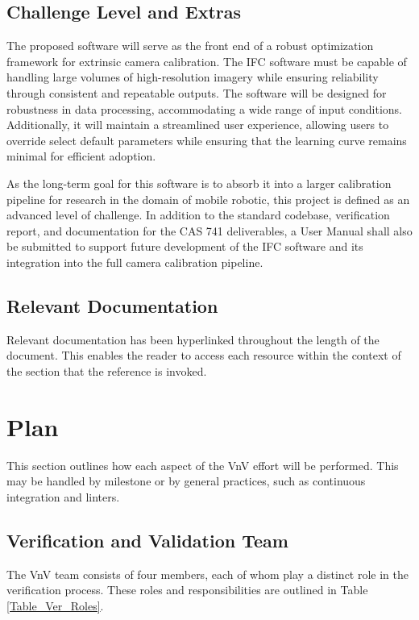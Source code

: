 \documentclass[12pt, titlepage]{article}
\begin{document}
\subsection{Challenge Level and Extras}
The proposed software will serve as the front end of a robust optimization framework 
for extrinsic camera calibration. The IFC software must be capable of handling large volumes of 
high-resolution imagery while ensuring reliability through consistent and repeatable outputs. 
The software will be designed for robustness in data processing, accommodating a wide range of 
input conditions. Additionally, it will maintain a streamlined user experience, allowing users 
to override select default parameters while ensuring that the learning curve remains minimal 
for efficient adoption. 

As the long-term goal for this software is to absorb it into a larger calibration 
pipeline for research in the domain of mobile robotic, this project is defined as 
an advanced level of challenge. In addition to the standard codebase, verification 
report, and documentation for the CAS 741 deliverables, a User Manual shall also be 
submitted to support future development of the IFC software and its integration into 
the full camera calibration pipeline.

\subsection{Relevant Documentation}
Relevant documentation has been hyperlinked throughout the length of the document. This enables 
the reader to access each resource within the context of the section that the reference is 
invoked.

\section{Plan}
This section outlines how each aspect of the VnV effort will be performed. This may be handled by 
milestone or by general practices, such as continuous integration and linters. 

\subsection{Verification and Validation Team}
The VnV team consists of four members, each of whom play a distinct role in the 
verification process. These roles and responsibilities are outlined in Table \ref{Table_Ver_Roles}.
\end{document}
